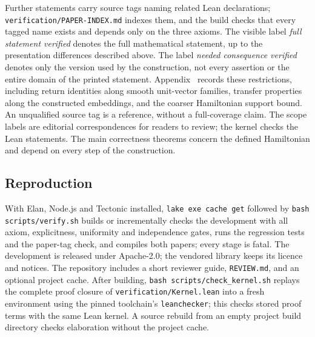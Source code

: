 Further statements carry source tags naming related Lean declarations; \texttt{verification/PAPER-INDEX.md} indexes
them, and the build checks that every tagged name exists and depends only on the three axioms.
The visible label \emph{full statement verified} denotes the full mathematical statement, up to the presentation
differences described above. The label \emph{needed consequence verified} denotes only the version used by the
construction, not every assertion or the entire domain of the printed statement. Appendix~
records these restrictions, including return identities along smooth unit-vector families, transfer properties along
the constructed embeddings, and the coarser Hamiltonian support bound. An unqualified source tag is a reference,
without a full-coverage claim.
The scope labels are editorial correspondences for readers to review; the kernel checks the Lean statements.
The main correctness theorems concern the defined Hamiltonian and depend on every step of the construction.

\subsection*{Reproduction}

With Elan, Node.js and Tectonic installed, \texttt{lake exe cache get} followed by \texttt{bash scripts/verify.sh}
builds or incrementally checks the development with all axiom, explicitness, uniformity and independence gates, runs the
regression tests and the paper-tag check, and compiles both papers; every stage is fatal. The development is released
under Apache-2.0; the vendored library keeps its licence and notices.
The repository includes a short reviewer guide, \texttt{REVIEW.md}, and an optional project cache.
After building, \texttt{bash scripts/check\_kernel.sh} replays the complete proof closure of
\texttt{verification/Kernel.lean} into a fresh environment using the pinned toolchain's
\texttt{leanchecker}; this checks stored proof terms with the same Lean kernel.
A source rebuild from an empty project build directory checks elaboration without the project cache.

\endgroup
